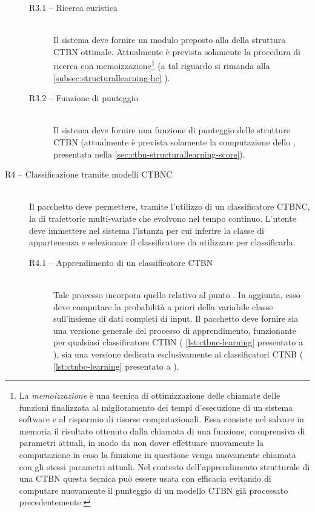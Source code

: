 \begin{description}
		\begin{description}
			\item[R3.1 -- Ricerca euristica] \hfill \\
			Il sistema deve fornire un modulo preposto alla  della struttura \acs{CTBN} ottimale. Attualmente è prevista solamente la procedura di ricerca \emph{\keyword{\hc{}}} con memoizzazione\footnote{La \emph{memoizzazione} è una tecnica di ottimizzazione delle chiamate delle funzioni finalizzata al miglioramento dei tempi d'esecuzione di un sistema software e al risparmio di risorse computazionali. Essa consiste nel salvare in memoria il risultato ottenuto dalla chiamata di una funzione, comprensiva di parametri attuali, in modo da non dover effettuare nuovamente la computazione in caso la funzione in questione venga nuovamente chiamata con gli stessi parametri attuali. Nel contesto dell'apprendimento strutturale di una \acs{CTBN} questa tecnica può essere usata con efficacia evitando di computare nuovamente il punteggio di un modello \acs{CTBN} già processato precedentemente.} (a tal riguardo si rimanda alla \autoref{subsec:structurallearning-hc} ).
			\item[R3.2 -- Funzione di punteggio] \hfill \\
			Il sistema deve fornire una funzione di punteggio delle strutture \acs{CTBN} (attualmente è prevista solamente la computazione dello \emph{}, presentata nella \vref{sec:ctbn-structurallearning-score}).
		\end{description}
	\item[R4 -- Classificazione tramite modelli CTBNC] \hfill \\
	Il pacchetto deve permettere, tramite l'utilizzo di un classificatore \acs{CTBNC}, la \emph{} di traiettorie multi-variate che evolvono nel tempo continuo. L'utente deve immettere nel sistema l'istanza per cui inferire la classe di appartenenza e selezionare il classificatore da utilizzare per classificarla.
		\begin{description}
		\item[R4.1 -- Apprendimento di un classificatore CTBN] \hfill \\
		Tale processo incorpora quello relativo al punto {\bfseries{}}. In aggiunta, esso deve computare la probabilità a priori della variabile classe sull'insieme di dati completi di input. Il pacchetto deve fornire sia una versione generale del processo di apprendimento, funzionante per qualsiasi classificatore \acs{CTBN} (\ie{} \autoref{lst:ctbnc-learning} presentato a ), sia una versione dedicata esclusivamente ai classificatori \acs{CTNB} (\ie{} \autoref{lst:ctnbc-learning} presentato a ).

\end{description}
\end{description}
